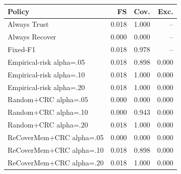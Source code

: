 \begin{tabular}{lrrr}
\toprule
Policy & FS & Cov. & Exc. \\
\midrule
Always Trust & 0.018 & 1.000 & -- \\
Always Recover & 0.000 & 0.000 & -- \\
Fixed-F1 & 0.018 & 0.978 & -- \\
Empirical-risk alpha=.05 & 0.018 & 0.898 & 0.000 \\
Empirical-risk alpha=.10 & 0.018 & 1.000 & 0.000 \\
Empirical-risk alpha=.20 & 0.018 & 1.000 & 0.000 \\
Random+CRC alpha=.05 & 0.000 & 0.000 & 0.000 \\
Random+CRC alpha=.10 & 0.000 & 0.943 & 0.000 \\
Random+CRC alpha=.20 & 0.018 & 1.000 & 0.000 \\
ReCoverMem+CRC alpha=.05 & 0.000 & 0.000 & 0.000 \\
ReCoverMem+CRC alpha=.10 & 0.018 & 0.898 & 0.000 \\
ReCoverMem+CRC alpha=.20 & 0.018 & 1.000 & 0.000 \\
\bottomrule
\end{tabular}
